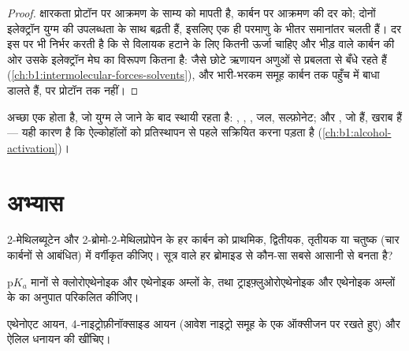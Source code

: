 \begin{proof}
क्षारकता प्रोटॉन पर आक्रमण के साम्य को मापती है,
 कार्बन पर आक्रमण की दर को; दोनों इलेक्ट्रॉन युग्म की
उपलब्धता के साथ बढ़ती हैं, इसलिए एक ही परमाणु के भीतर समानांतर चलती हैं।
दर इस पर भी निर्भर करती है कि  से विलायक हटाने के लिए कितनी ऊर्जा चाहिए
और भीड़ वाले कार्बन की ओर उसके इलेक्ट्रॉन मेघ का
विरूपण कितना है:  जैसे छोटे ऋणायन  अणुओं से
प्रबलता से बँधे रहते हैं (\cref{ch:b1:intermolecular-forces-solvents}), और
भारी-भरकम समूह कार्बन तक पहुँच में बाधा डालते हैं, पर प्रोटॉन तक नहीं।
\end{proof}

अच्छा  एक  होता है, जो युग्म ले जाने के बाद स्थायी रहता है:
, , , जल, सल्फ़ोनेट;  और , जो  हैं, खराब  हैं --- यही कारण है कि ऐल्कोहॉलों को
प्रतिस्थापन से पहले सक्रियित करना पड़ता है (\cref{ch:b1:alcohol-activation})।

\section{अभ्यास}

\begin{exercise}[$\star$]\label{exo:b1:electronic-effects:1}
2-मेथिलब्यूटेन और 2-ब्रोमो-2-मेथिलप्रोपेन के हर कार्बन को
प्राथमिक, द्वितीयक, तृतीयक या चतुष्क (चार कार्बनों से आबंधित) में वर्गीकृत कीजिए।
सूत्र  वाले हर ब्रोमाइड से कौन-सा  सबसे आसानी से बनता है?
\end{exercise}

\begin{exercise}[$\star$]\label{exo:b1:electronic-effects:2}
$\mathrm{p}K_a$ मानों से क्लोरोएथेनोइक और एथेनोइक अम्लों के, तथा ट्राइफ़्लुओरोएथेनोइक
और एथेनोइक अम्लों के  का अनुपात
परिकलित कीजिए।
\end{exercise}

\begin{exercise}[$\star$]\label{exo:b1:electronic-effects:3}
एथेनोएट आयन, 4-नाइट्रोफ़ीनॉक्साइड
आयन (आवेश नाइट्रो समूह के एक ऑक्सीजन पर रखते हुए) और ऐलिल
धनायन  की  खींचिए।
\end{exercise}

